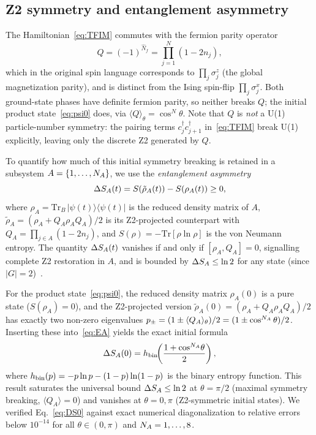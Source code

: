 \subsection{Z2 symmetry and entanglement asymmetry}
\label{sec:EA}

The Hamiltonian~\eqref{eq:TFIM} commutes with the fermion parity operator
\begin{equation}
  Q = (-1)^{\hat{N}_f} = \prod_{j=1}^{N}(1-2n_j),
  \label{eq:Q}
\end{equation}
which in the original spin language corresponds to $\prod_j\sigma^z_j$ (the global
magnetization parity), and is distinct from the Ising spin-flip $\prod_j\sigma^x_j$.
Both ground-state phases have definite fermion parity, so neither breaks $Q$; the initial
product state~\eqref{eq:psi0} does, via $\langle Q\rangle_\theta = \cos^N\theta$.
Note that $Q$ is \emph{not} a U(1) particle-number symmetry: the pairing terms
$c_j^\dagger c_{j+1}^\dagger$ in~\eqref{eq:TFIM} break U(1) explicitly, leaving only
the discrete Z2 generated by $Q$.

To quantify how much of this initial symmetry breaking is retained in a
subsystem $A = \{1,\ldots,N_A\}$, we use the \emph{entanglement asymmetry}~\cite{Ares2023}
\begin{equation}
  \Delta S_A(t) = S(\tilde\rho_A(t)) - S(\rho_A(t)) \geq 0,
  \label{eq:EA}
\end{equation}
where $\rho_A = \mathrm{Tr}_B\,|\psi(t)\rangle\langle\psi(t)|$ is the reduced density matrix
of $A$, $\tilde\rho_A = (\rho_A + Q_A\rho_A Q_A)/2$ is its Z2-projected counterpart with
$Q_A = \prod_{j\in A}(1-2n_j)$, and $S(\rho) = -\mathrm{Tr}[\rho\ln\rho]$ is the von
Neumann entropy. The quantity $\Delta S_A(t)$ vanishes if and only if $[\rho_A, Q_A] = 0$,
signalling complete Z2 restoration in $A$, and is bounded by
$\Delta S_A \leq \ln 2$ for any state (since $|G| = 2$)~\cite{Ares2023}.

For the product state~\eqref{eq:psi0}, the reduced density matrix $\rho_A(0)$ is a pure
state ($S(\rho_A) = 0$), and the Z2-projected version
$\tilde\rho_A(0) = (\rho_A + Q_A\rho_A Q_A)/2$ has exactly two non-zero eigenvalues
$p_\pm = (1 \pm \langle Q_A\rangle_\theta)/2 = (1 \pm \cos^{N_A}\theta)/2$.
Inserting these into~\eqref{eq:EA} yields the exact initial formula
\begin{equation}
  \Delta S_A(0) = h_{\rm bin}\!\!\left(\frac{1+\cos^{N_A}\!\theta}{2}\right),
  \label{eq:DS0}
\end{equation}
where $h_{\rm bin}(p) = -p\ln p - (1-p)\ln(1-p)$ is the binary entropy function.
This result saturates the universal bound $\Delta S_A \leq \ln 2$ at $\theta = \pi/2$ (maximal
symmetry breaking, $\langle Q_A\rangle = 0$) and vanishes at $\theta = 0, \pi$
(Z2-symmetric initial states).
We verified Eq.~\eqref{eq:DS0} against exact numerical diagonalization to
relative errors below $10^{-14}$ for all $\theta \in (0,\pi)$ and $N_A = 1,\ldots,8$.

